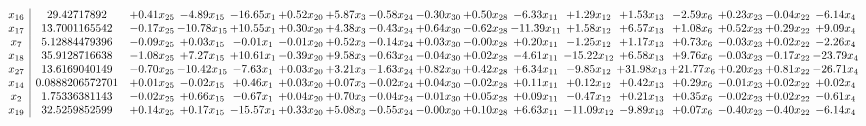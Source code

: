 \documentclass[9pt]{article}
\begin{document}
 \[\begin{array}{c| c c@{\hskip 2pt} c@{\hskip 2pt} c@{\hskip 2pt} c@{\hskip 2pt} c@{\hskip 2pt} c@{\hskip 2pt} c@{\hskip 2pt} c@{\hskip 2pt} c@{\hskip 2pt} c@{\hskip 2pt} c@{\hskip 2pt} c@{\hskip 2pt} c@{\hskip 2pt} c@{\hskip 2pt} c@{\hskip 2pt} }
 x_{16}   &  29.42717892 & +  0.41 x_{25} & -4.89 x_{15} & -16.65 x_{1} & +  0.52 x_{20} & +  5.87 x_{3} & -0.58 x_{24} & -0.30 x_{30} & +  0.50 x_{28} & -6.33 x_{11} & +  1.29 x_{12} & +  1.53 x_{13} & -2.59 x_{6} & +  0.23 x_{23} & -0.04 x_{22} & -6.14 x_{4}\\
 x_{17}   &  13.7001165542 & -0.17 x_{25} & -10.78 x_{15} & + 10.55 x_{1} & +  0.30 x_{20} & +  4.38 x_{3} & -0.43 x_{24} & +  0.64 x_{30} & -0.62 x_{28} & -11.39 x_{11} & +  1.58 x_{12} & +  6.57 x_{13} & +  1.08 x_{6} & +  0.52 x_{23} & +  0.29 x_{22} & +  9.09 x_{4}\\
 x_{7}   &  5.12884479396 & -0.09 x_{25} & +  0.03 x_{15} & -0.01 x_{1} & -0.01 x_{20} & +  0.52 x_{3} & -0.14 x_{24} & +  0.03 x_{30} & -0.00 x_{28} & +  0.20 x_{11} & -1.25 x_{12} & +  1.17 x_{13} & +  0.73 x_{6} & -0.03 x_{23} & +  0.02 x_{22} & -2.26 x_{4}\\
 x_{18}   &  35.9128716638 & -1.08 x_{25} & +  7.27 x_{15} & + 10.61 x_{1} & -0.39 x_{20} & +  9.58 x_{3} & -0.63 x_{24} & -0.04 x_{30} & +  0.02 x_{28} & -4.61 x_{11} & -15.22 x_{12} & +  6.58 x_{13} & +  9.76 x_{6} & -0.03 x_{23} & -0.17 x_{22} & -23.79 x_{4}\\
 x_{27}   &  13.6169040149 & -0.70 x_{25} & -10.42 x_{15} & -7.63 x_{1} & +  0.03 x_{20} & +  3.21 x_{3} & -1.63 x_{24} & +  0.82 x_{30} & +  0.42 x_{28} & +  6.34 x_{11} & -9.85 x_{12} & + 31.98 x_{13} & + 21.77 x_{6} & +  0.20 x_{23} & +  0.81 x_{22} & -26.71 x_{4}\\
 x_{14}   &  0.0888206572701 & +  0.01 x_{25} & -0.02 x_{15} & +  0.46 x_{1} & +  0.03 x_{20} & +  0.07 x_{3} & -0.02 x_{24} & +  0.04 x_{30} & -0.02 x_{28} & +  0.11 x_{11} & +  0.12 x_{12} & +  0.42 x_{13} & +  0.29 x_{6} & -0.01 x_{23} & +  0.02 x_{22} & +  0.02 x_{4}\\
 x_{2}   &  1.75336381143 & -0.02 x_{25} & +  0.66 x_{15} & -0.67 x_{1} & +  0.04 x_{20} & +  0.70 x_{3} & -0.04 x_{24} & -0.01 x_{30} & +  0.05 x_{28} & +  0.09 x_{11} & -0.47 x_{12} & +  0.21 x_{13} & +  0.35 x_{6} & -0.02 x_{23} & +  0.02 x_{22} & -0.61 x_{4}\\
 x_{19}   &  32.5259852599 & +  0.14 x_{25} & +  0.17 x_{15} & -15.57 x_{1} & +  0.33 x_{20} & +  5.08 x_{3} & -0.55 x_{24} & -0.00 x_{30} & +  0.10 x_{28} & +  6.63 x_{11} & -11.09 x_{12} & -9.89 x_{13} & +  0.07 x_{6} & -0.40 x_{23} & -0.40 x_{22} & -6.14 x_{4}\\

\end{array}\]
\end{document}
